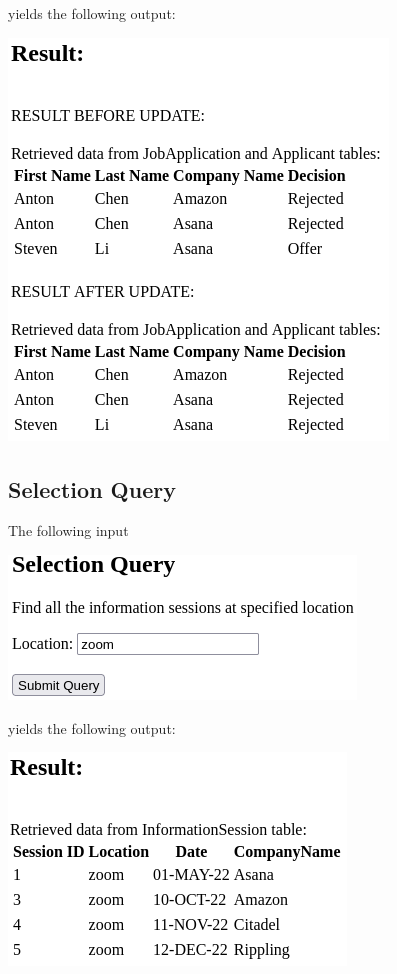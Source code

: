 yields the following output:

\includegraphics[width=\linewidth]{src/6/2022-03-30-174523_381x403_scrot.png}

\newpage

\subsection{Selection Query}

The following input

\includegraphics[width=0.5\linewidth]{src/6/2022-03-30-174731_349x145_scrot.png}

yields the following output:

\includegraphics[width=\linewidth]{src/6/2022-03-30-174738_339x214_scrot.png}

